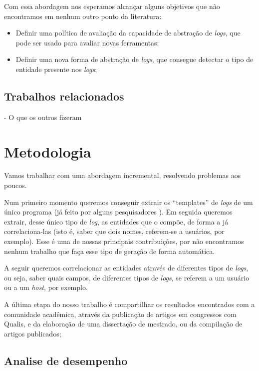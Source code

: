 \documentclass[
	12pt,				%
	openright,			%
	twoside,			%
	a4paper,			%
	english,			%
	french,				%
	spanish,			%
	brazil,				%
	]{abntex2}
\begin{document}
Com essa abordagem nos esperamos alcançar alguns objetivos que não encontramos em nenhum outro ponto da literatura:

\begin{itemize}
	\item Definir uma política de avaliação da capacidade de abstração de \emph{logs}, que pode ser usado para avaliar novas ferramentas;
	\item Definir uma nova forma de abstração de \emph{logs}, que consegue detectar o tipo de entidade presente nos \emph{logs};
\end{itemize}

\subsection{Trabalhos relacionados}
- O que os outros fizeram

\section{Metodologia}

Vamos trabalhar com uma abordagem incremental, resolvendo problemas aos poucos.

Num primeiro momento queremos conseguir extrair os ``templates'' de \emph{logs} de um único programa (já feito por alguns pesquisadores \cite{nagappan2010abstracting}). Em seguida queremos extrair, desse único tipo de \emph{log}, as entidades que o compõe, de forma a já correlaciona-las (isto é, saber que dois nomes, referem-se a usuários, por exemplo). Esse é uma de nossas principais contribuições, por não encontramos nenhum trabalho que faça esse tipo de geração de forma automática.

A seguir queremos correlacionar as entidades através de diferentes tipos de \emph{logs}, ou seja, saber quais campos, de diferentes tipos de \emph{logs}, se referem a um usuário ou a um \emph{host}, por exemplo.

A última etapa do nosso trabalho é compartilhar os resultados encontrados com a comunidade acadêmica, através da publicação de artigos em congressos com Qualis, e  da elaboração de uma dissertação de mestrado, ou da compilação de artigos publicados;

\subsection{Analise de desempenho}

\end{document}
